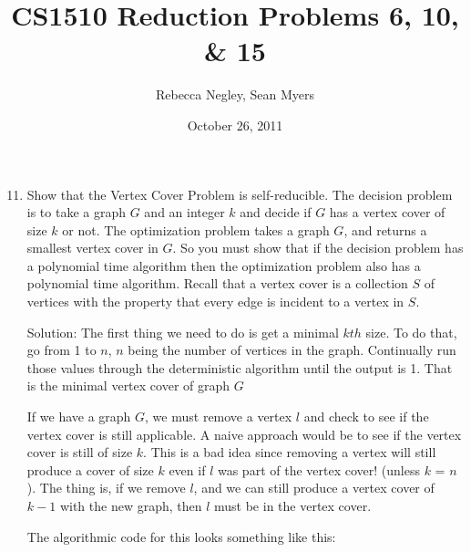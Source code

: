 \documentclass{article}
\title{CS1510  Reduction Problems 6, 10, \& 15}
\author{Rebecca Negley, Sean Myers}
\date{October 26, 2011}
\begin{document}
\maketitle

\begin{enumerate}
\setcounter{enumi}{10}
\item Show that the Vertex Cover Problem is self-reducible. The decision problem is to take a graph $G$ and
\newline an integer $k$ and decide if $G$ has a vertex cover of size $k$ or not. The optimization problem takes a
\newline graph $G$, and returns a smallest vertex cover in $G$. So you must show that if the decision problem
\newline has a polynomial time algorithm then the optimization problem also has a polynomial time algorithm.
\newline Recall that a vertex cover is a collection $S$ of vertices with the property that every edge is incident to
\newline a vertex in $S$.

Solution: The first thing we need to do is get a minimal $kth$ size. To do that, go from 1 to $n$, $n$ being the number of vertices in the graph. Continually run those values through the deterministic algorithm until the output is 1. That is the minimal vertex cover of graph $G$

If we have a graph $G$, we must remove a vertex $l$ and check to see if the vertex cover is still applicable. A naive approach would be to see if the vertex cover is still of size $k$. This is a bad idea since removing a vertex will still produce a cover of size $k$ even if $l$ was part of the vertex cover! (unless $k$ = $n$). The thing is, if we remove $l$, and we can still produce a vertex cover of $k-1$ with the new graph, then $l$ must be in the vertex cover. 

The algorithmic code for this looks something like this:


\end{enumerate}
\end{document}
